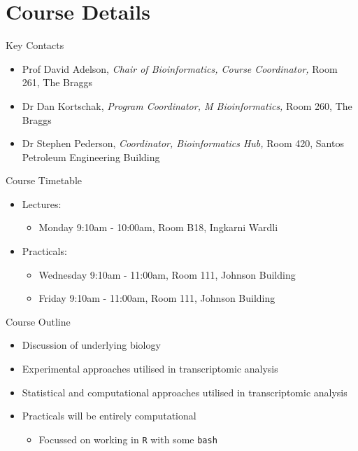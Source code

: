 \documentclass[aspectratio=169,11pt]{beamer}
\begin{document}
\section{Course Details}

\linespread{1.3}

\begin{frame}{Key Contacts}

	\begin{itemize}
		\item Prof David Adelson, \textit{Chair of Bioinformatics, Course Coordinator,} Room 261, The Braggs
		\item Dr Dan Kortschak, \textit{Program Coordinator, M Bioinformatics,} Room 260, The Braggs
		\item Dr Stephen Pederson, \textit{Coordinator, Bioinformatics Hub,} Room 420, Santos Petroleum Engineering Building
	\end{itemize}

\end{frame}

\begin{frame}{Course Timetable}

	\begin{itemize}
		\item Lectures:
		\begin{itemize}
			\item Monday 9:10am - 10:00am, Room B18, Ingkarni Wardli
\end{itemize}		 
		\item Practicals:
		\begin{itemize}
			\item Wednesday 9:10am - 11:00am, Room 111, Johnson Building
			\item Friday 9:10am - 11:00am, Room 111, Johnson Building
		\end{itemize}
	\end{itemize}

\end{frame}

\begin{frame}{Course Outline}

	\begin{itemize}
		\item Discussion of underlying biology
		\item Experimental approaches utilised in transcriptomic analysis
		\item Statistical and computational approaches utilised in transcriptomic analysis
		\item Practicals will be entirely computational
		\begin{itemize}
			\item Focussed on working in \texttt{R} with some \texttt{bash}
		\end{itemize}
	\end{itemize}

\end{frame}
\end{document}
